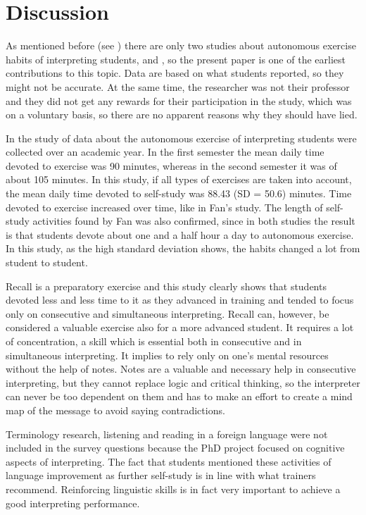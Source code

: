 \documentclass[output=paper]{../langscibook}
\begin{document}
\section{Discussion}
As mentioned before (see ) there are only two studies about autonomous exercise habits of interpreting students, \citet{Fan2012} and \citet{Wang2016}, so the present paper is one of the earliest contributions to this topic. Data are based on what students reported, so they might not be accurate. At the same time, the researcher was not their professor and they did not get any rewards for their participation in the study, which was on a voluntary basis, so there are no apparent reasons why they should have lied.

In the study of \citet{Fan2012} data about the autonomous exercise of interpreting students were collected over an academic year. In the first semester the mean daily time devoted to exercise was 90 minutes, whereas in the second semester it was of about 105 minutes. In this study, if all types of exercises are taken into account, the mean daily time devoted to self-study was 88.43 (SD = 50.6) minutes. Time devoted to exercise increased over time, like in Fan’s study. The length of self-study activities found by Fan was also confirmed, since in both studies the result is that students devote about one and a half hour a day to autonomous exercise. In this study, as the high standard deviation shows, the habits changed a lot from student to student.

Recall is a preparatory exercise and this study clearly shows that students devoted less and less time to it as they advanced in training and tended to focus only on consecutive and simultaneous interpreting. Recall can, however, be considered a valuable exercise also for a more advanced student. It requires a lot of concentration, a skill which is essential both in consecutive and in simultaneous interpreting. It implies to rely only on one’s mental resources without the help of notes. Notes are a valuable and necessary help in consecutive interpreting, but they cannot replace logic and critical thinking, so the interpreter can never be too dependent on them and has to make an effort to create a mind map of the message to avoid saying contradictions.

Terminology research, listening and reading in a foreign language were not included in the survey questions because the PhD project focused on cognitive aspects of interpreting. The fact that students mentioned these activities of language improvement as further self-study is in line with what trainers recommend. Reinforcing linguistic skills is in fact very important to achieve a good interpreting performance.
\end{document}
